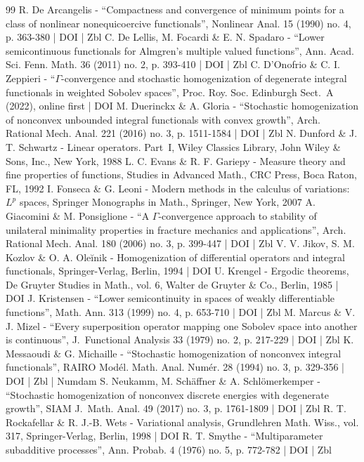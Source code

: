 \documentclass[10pt]{amsart}
\theoremstyle{definition}
\begin{document}
\begin{thebibliography}{99}
R. De Arcangelis - “Compactness and convergence of minimum points for a class of nonlinear nonequicoercive functionals”, Nonlinear Anal. 15 (1990) no. 4, p. 363-380 | DOI | Zbl
C. De Lellis, M. Focardi \& E. N. Spadaro - “Lower semicontinuous functionals for Almgren’s multiple valued functions”, Ann. Acad. Sci. Fenn. Math. 36 (2011) no. 2, p. 393-410 | DOI | Zbl
C. D’Onofrio \& C. I. Zeppieri - “$\Gamma $-convergence and stochastic homogenization of degenerate integral functionals in weighted Sobolev spaces”, Proc. Roy. Soc. Edinburgh Sect. A (2022), online first | DOI
M. Duerinckx \& A. Gloria - “Stochastic homogenization of nonconvex unbounded integral functionals with convex growth”, Arch. Rational Mech. Anal. 221 (2016) no. 3, p. 1511-1584 | DOI | Zbl
N. Dunford \& J. T. Schwartz - Linear operators. Part I, Wiley Classics Library, John Wiley \& Sons, Inc., New York, 1988
L. C. Evans \& R. F. Gariepy - Measure theory and fine properties of functions, Studies in Advanced Math., CRC Press, Boca Raton, FL, 1992
I. Fonseca \& G. Leoni - Modern methods in the calculus of variations: $L^p$ spaces, Springer Monographs in Math., Springer, New York, 2007
A. Giacomini \& M. Ponsiglione - “A $\Gamma $-convergence approach to stability of unilateral minimality properties in fracture mechanics and applications”, Arch. Rational Mech. Anal. 180 (2006) no. 3, p. 399-447 | DOI | Zbl
V. V. Jikov, S. M. Kozlov \& O. A. Oleĭnik - Homogenization of differential operators and integral functionals, Springer-Verlag, Berlin, 1994 | DOI
U. Krengel - Ergodic theorems, De Gruyter Studies in Math., vol. 6, Walter de Gruyter \& Co., Berlin, 1985 | DOI
J. Kristensen - “Lower semicontinuity in spaces of weakly differentiable functions”, Math. Ann. 313 (1999) no. 4, p. 653-710 | DOI | Zbl
M. Marcus \& V. J. Mizel - “Every superposition operator mapping one Sobolev space into another is continuous”, J. Functional Analysis 33 (1979) no. 2, p. 217-229 | DOI | Zbl
K. Messaoudi \& G. Michaille - “Stochastic homogenization of nonconvex integral functionals”, RAIRO Modél. Math. Anal. Numér. 28 (1994) no. 3, p. 329-356 | DOI | Zbl | Numdam
S. Neukamm, M. Schäffner \& A. Schlömerkemper - “Stochastic homogenization of nonconvex discrete energies with degenerate growth”, SIAM J. Math. Anal. 49 (2017) no. 3, p. 1761-1809 | DOI | Zbl
R. T. Rockafellar \& R. J.-B. Wets - Variational analysis, Grundlehren Math. Wiss., vol. 317, Springer-Verlag, Berlin, 1998 | DOI
R. T. Smythe - “Multiparameter subadditive processes”, Ann. Probab. 4 (1976) no. 5, p. 772-782 | DOI | Zbl
\end{thebibliography}
\end{document}
